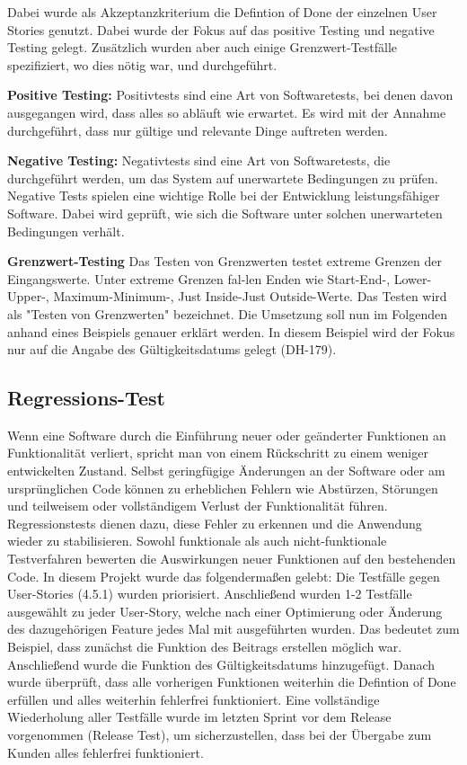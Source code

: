 Dabei wurde als Akzeptanzkriterium die Defintion of Done der einzelnen User Stories genutzt. Dabei wurde der Fokus auf das positive Testing und negative Testing gelegt. Zusätzlich wurden aber auch einige Grenzwert-Testfälle spezifiziert, wo dies nötig war, und durchgeführt.

\textbf{Positive Testing:}
Positivtests sind eine Art von Softwaretests, bei denen davon ausgegangen wird, dass alles so abläuft wie erwartet. Es wird mit der Annahme durchgeführt, dass nur gültige und relevante Dinge auftreten werden.

\textbf{Negative Testing:}
Negativtests sind eine Art von Softwaretests, die durchgeführt werden, um das System auf unerwartete Bedingungen zu prüfen. Negative Tests spielen eine wichtige Rolle bei der Entwicklung leistungsfähiger Software. Dabei wird geprüft, wie sich die Software unter solchen unerwarteten Bedingungen verhält.

\textbf{Grenzwert-Testing}
Das Testen von Grenzwerten testet extreme Grenzen der Eingangswerte. Unter extreme Grenzen fal-len Enden wie Start-End-, Lower-Upper-, Maximum-Minimum-, Just Inside-Just Outside-Werte. Das Testen wird als "Testen von Grenzwerten" bezeichnet.
Die Umsetzung soll nun im Folgenden anhand eines Beispiels genauer erklärt werden. In diesem Beispiel wird der Fokus nur auf die Angabe des Gültigkeitsdatums gelegt (DH-179).

\subsection{Regressions-Test}
\label{sub:UmsetzungTestRegression}

Wenn eine Software durch die Einführung neuer oder geänderter Funktionen an Funktionalität verliert, spricht man von einem Rückschritt zu einem weniger entwickelten Zustand. Selbst geringfügige Änderungen an der Software oder am ursprünglichen Code können zu erheblichen Fehlern wie Abstürzen, Störungen und teilweisem oder vollständigem Verlust der Funktionalität führen.
Regressionstests dienen dazu, diese Fehler zu erkennen und die Anwendung wieder zu stabilisieren. Sowohl funktionale als auch nicht-funktionale Testverfahren bewerten die Auswirkungen neuer Funktionen auf den bestehenden Code.
In diesem Projekt wurde das folgendermaßen gelebt: Die Testfälle gegen User-Stories (4.5.1) wurden priorisiert. Anschließend wurden 1-2 Testfälle ausgewählt zu jeder User-Story, welche nach einer Optimierung oder Änderung des dazugehörigen Feature jedes Mal mit ausgeführten wurden. Das bedeutet zum Beispiel, dass zunächst die Funktion des Beitrags erstellen möglich war. Anschließend wurde die Funktion des Gültigkeitsdatums hinzugefügt. Danach wurde überprüft, dass alle vorherigen Funktionen weiterhin die Defintion of Done erfüllen und alles weiterhin fehlerfrei funktioniert.
Eine vollständige Wiederholung aller Testfälle wurde im letzten Sprint vor dem Release vorgenommen (Release Test), um sicherzustellen, dass bei der Übergabe zum Kunden alles fehlerfrei funktioniert.


